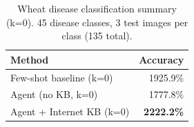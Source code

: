 \begin{table}[t]
\centering
\small
\caption{Wheat disease classification summary (k=0). 45 disease classes, 3 test images per class (135 total).}
\label{tab:wheat_summary}
\begin{tabular}{lr}
\toprule
Method & Accuracy \\
\midrule
Few-shot baseline (k=0) & 1925.9\% \\
Agent (no KB, k=0) & 1777.8\% \\
Agent + Internet KB (k=0) & \textbf{2222.2\%} \\
\bottomrule
\end{tabular}
\end{table}